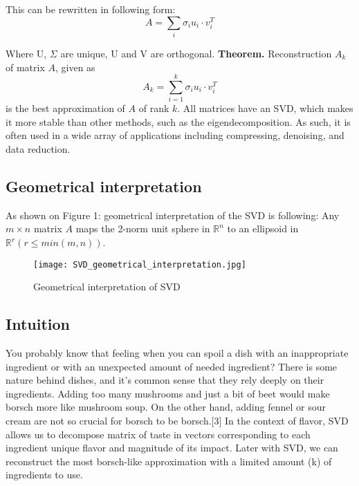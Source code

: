 This can be rewritten in following form:
\[
A = \sum_{i}\sigma_iu_i  \cdot  v_i^T
\]

Where U, $\Sigma$ are unique, U and V are orthogonal. 
\newline
\textbf{Theorem.} Reconstruction $A_k$ of matrix $A$, given as  
\[
A_k = \sum_{i = 1}^k\sigma_iu_i  \cdot  v_i^T
\]
is the best approximation of $A$ of rank $k$.
\newline
All matrices have an SVD, which makes it more stable than other methods, such as the eigendecomposition. As such, it is often used in a wide array of applications including compressing, denoising, and data reduction.

\subsection{Geometrical interpretation}
As shown on Figure 1: geometrical interpretation of the SVD is following:
\newline
Any $m \times n$ matrix $A$ maps the 2-norm unit sphere in $\mathbb{R}^n$ to an ellipsoid in $\mathbb{R}^r (r \leq min(m,n))$.
\begin{figure}[h]
	\centering
	\texttt{[image: SVD\_geometrical\_interpretation.jpg]}
	\caption{\label{fig:geom_interpretation}Geometrical interpretation of SVD}
\end{figure}

\subsection{Intuition}
You probably know that feeling when you can spoil a dish with an inappropriate ingredient or with an unexpected amount of needed ingredient? There is some nature behind dishes, and it's common sense that they rely deeply on their ingredients. Adding too many mushrooms and just a bit of beet would make borsch more like mushroom soup. On the other hand, adding fennel or sour cream are not so crucial for borsch to be borsch.[3]
\newline
In the context of flavor, SVD allows us to decompose matrix of taste in vectors corresponding to each ingredient unique flavor and magnitude of its impact.
\newline
Later with SVD, we can reconstruct the most borsch-like approximation with a limited amount (k) of ingredients to use.

